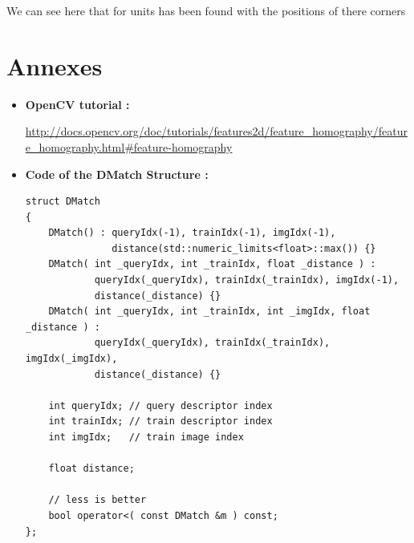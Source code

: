\documentclass[english,a4paper,11pt]{report}
\begin{document}
	\par We can see here that for units has been found with the positions of there corners

	
	

	\clearpage

	{}
	

	\chapter{Annexes}
	
	\begin{itemize}
	\item
		\hypertarget{opencv}{\textbf{OpenCV tutorial :\\}}	\url{http://docs.opencv.org/doc/tutorials/features2d/feature_homography/feature_homography.html#feature-homography}\\

	\item
	\hypertarget{structDMatch}{\textbf{Code of the DMatch Structure :}}
	\begin{lstlisting}
struct DMatch
{
    DMatch() : queryIdx(-1), trainIdx(-1), imgIdx(-1),
               distance(std::numeric_limits<float>::max()) {}
    DMatch( int _queryIdx, int _trainIdx, float _distance ) :
            queryIdx(_queryIdx), trainIdx(_trainIdx), imgIdx(-1),
            distance(_distance) {}
    DMatch( int _queryIdx, int _trainIdx, int _imgIdx, float _distance ) :
            queryIdx(_queryIdx), trainIdx(_trainIdx), imgIdx(_imgIdx),
            distance(_distance) {}

    int queryIdx; // query descriptor index
    int trainIdx; // train descriptor index
    int imgIdx;   // train image index

    float distance;

    // less is better
    bool operator<( const DMatch &m ) const;
};
	\end{lstlisting}	
	
\end{itemize}		
	


	\listoffigures
		
	
	
	
	

	
	
	
\end{document}
